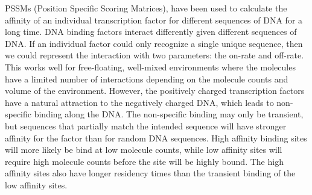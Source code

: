 \documentclass{article}
\newcommand{\tab}{\hspace{9mm}}
\begin{document}
\tab PSSMs (Position Specific Scoring Matrices), have been used to calculate the affinity of an individual transcription factor for different sequences of DNA for a long time. DNA binding factors interact differently given different sequences of DNA. If an individual factor could only recognize a single unique sequence, then we could represent the interaction with two parameters: the on-rate and off-rate. This works well for free-floating, well-mixed environments where the molecules have a limited number of interactions depending on the molecule counts and volume of the environment. However, the positively charged transcription factors have a natural attraction to the negatively charged DNA, which leads to non-specific binding along the DNA. The non-specific binding may only be transient, but sequences that partially match the intended sequence will have stronger affinity for the factor than for random DNA sequences. High affinity binding sites will more likely be bind at low molecule counts, while low affinity sites will require high molecule counts before the site will be highly bound. The high affinity sites also have longer residency times than the transient binding of the low affinity sites.
\end{document}
